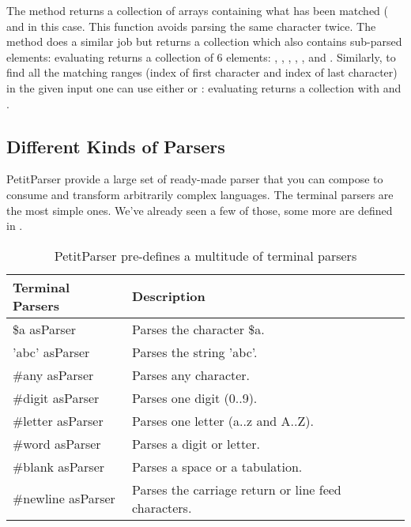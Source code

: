 \documentclass[a4paper,10pt,twoside]{book}
\begin{document}
The  method returns a collection of arrays
containing what has been matched (\eg{}  and
 in this case. This function avoids parsing
the same character twice. The method  does a
similar job but returns a collection which also contains sub-parsed
elements: \eg{} evaluating 
returns a collection of 6 elements: ,%
, , ,%
, and . Similarly, to find
all the matching ranges (index of first character and index of last
character) in the given input one can use either
 or :
\eg{} evaluating %
 returns a
collection with  and .

\subsection{Different Kinds of Parsers}

PetitParser provide a large set of ready-made parser that you can
compose to consume and transform arbitrarily complex languages. The
terminal parsers are the most simple ones. We've already seen a few of
those, some more are defined in .

\begin{table}
  \centering
  \begin{tabular}{ll}
    \textbf{Terminal Parsers} & \textbf{Description}                                \\
    \midrule
    \$a asParser              & Parses the character \$a.                           \\
    'abc' asParser            & Parses the string 'abc'.                            \\
    \#any asParser            & Parses any character.                               \\
    \#digit asParser          & Parses one digit (0..9).                            \\
    \#letter asParser         & Parses one letter (a..z and A..Z).                  \\
    \#word asParser           & Parses a digit or letter.                           \\
    \#blank asParser          & Parses a space or a tabulation.                     \\
    \#newline asParser        & Parses the carriage return or line feed characters. \\
  \end{tabular}
  \caption{PetitParser pre-defines a multitude of terminal parsers}
  \label{tab:terminal-parsers}
\end{table}
\end{document}
